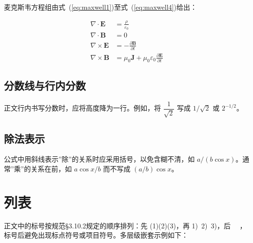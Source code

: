 麦克斯韦方程组由式~(\ref{eq:maxwell1})至式~(\ref{eq:maxwell4})给出：

\begin{align}
    \nabla \cdot \mathbf{E}  &= \frac{\rho}{\varepsilon_0}                             \label{eq:maxwell1} \\
    \nabla \cdot \mathbf{B}  &= 0                                                       \label{eq:maxwell2} \\
    \nabla \times \mathbf{E} &= -\frac{\partial \mathbf{B}}{\partial t}                \label{eq:maxwell3} \\
    \nabla \times \mathbf{B} &= \mu_0\mathbf{J} + \mu_0\varepsilon_0
                                \frac{\partial \mathbf{E}}{\partial t}                 \label{eq:maxwell4}
\end{align}

\subsection{分数线与行内分数}


正文行内书写分数时，应将高度降为一行。例如，将 $\dfrac{1}{\sqrt{2}}$ 写成 $1/\sqrt{2}$ 或 $2^{-1/2}$。

\subsection{除法表示}

公式中用斜线表示”除”的关系时应采用括号，以免含糊不清，如 $a/(b\cos x)$。通常”乘”的关系在前，如 $a\cos x/b$ 而不写成 $(a/b)\cos x$。


\section{列表}
\label{sec:list}

正文中的标号按规范§3.10.2规定的顺序排列：先 (1)(2)(3)，再 1)~2)~3)，后 ~~，标号后避免出现标点符号或项目符号。多层级嵌套示例如下：

